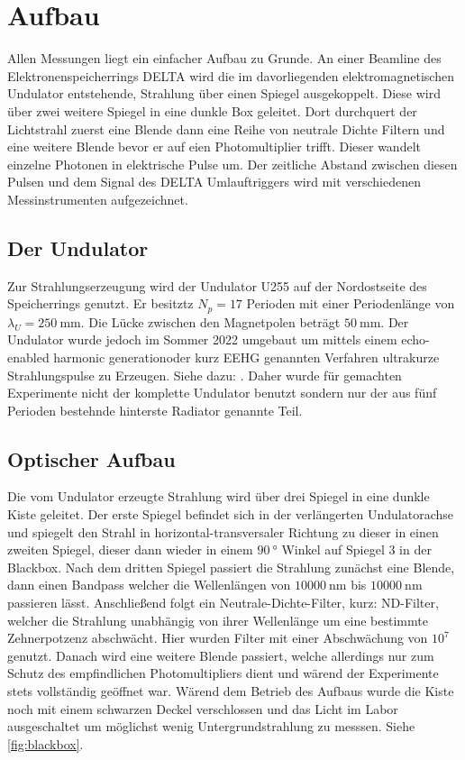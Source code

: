 \section{Aufbau}
\label{sec:Aufbau}
Allen Messungen liegt ein einfacher Aufbau zu Grunde. An einer Beamline des Elektronenspeicherrings DELTA
wird die im davorliegenden elektromagnetischen Undulator entstehende, Strahlung über einen Spiegel 
ausgekoppelt. Diese wird über zwei weitere Spiegel in eine dunkle Box geleitet. Dort durchquert der 
Lichtstrahl zuerst eine Blende dann eine Reihe von neutrale Dichte Filtern und eine weitere Blende bevor 
er auf eien Photomultiplier trifft. Dieser wandelt einzelne Photonen in elektrische Pulse um. Der 
zeitliche Abstand zwischen diesen Pulsen und dem Signal des DELTA Umlauftriggers wird mit verschiedenen 
Messinstrumenten aufgezeichnet. 

\subsection{Der Undulator}
\label{sec:Undulator}
Zur Strahlungserzeugung wird der Undulator U255 auf der Nordostseite des Speicherrings genutzt.
Er besitztz $N_p= 17$ Perioden mit einer Periodenlänge von $\lambda_U=\SI{250}{\milli\meter}$.
Die Lücke zwischen den Magnetpolen beträgt $\SI{50}{\milli\meter}$. Der Undulator wurde jedoch
im Sommer 2022 umgebaut um mittels einem \glqq echo-enabled harmonic generation\grqq  oder kurz EEHG 
genannten Verfahren ultrakurze Strahlungspulse zu Erzeugen. Siehe dazu: . Daher wurde für gemachten 
Experimente nicht der komplette Undulator benutzt sondern nur der aus fünf Perioden bestehnde hinterste
Radiator genannte Teil.

\subsection{Optischer Aufbau}
\label{sec:Optik}
Die vom Undulator erzeugte Strahlung wird über drei Spiegel in eine dunkle Kiste geleitet. Der erste Spiegel
befindet sich in der verlängerten Undulatorachse und spiegelt den Strahl in horizontal-transversaler Richtung 
zu dieser in einen zweiten Spiegel, dieser dann wieder in einem $\SI{90}{\degree}$ Winkel auf Spiegel 3 in der
Blackbox. Nach dem dritten Spiegel passiert die Strahlung zunächst eine Blende, dann einen Bandpass welcher die 
Wellenlängen von $\SI{10000}{\nano\meter}$ bis $\SI{10000}{\nano\meter}$ passieren lässt. Anschließend folgt
ein Neutrale-Dichte-Filter, kurz: ND-Filter, welcher die Strahlung unabhängig von ihrer Wellenlänge um eine
bestimmte Zehnerpotzenz abschwächt. Hier wurden Filter mit einer Abschwächung von $10^7$ genutzt. Danach 
wird eine weitere Blende passiert, welche allerdings nur zum Schutz des empfindlichen Photomultipliers dient 
und wärend der Experimente stets vollständig geöffnet war. Wärend dem Betrieb des Aufbaus wurde die Kiste noch 
mit einem schwarzen Deckel verschlossen und das Licht im Labor ausgeschaltet um möglichst wenig Untergrundstrahlung
zu messsen. Siehe \autoref{fig:blackbox}.

